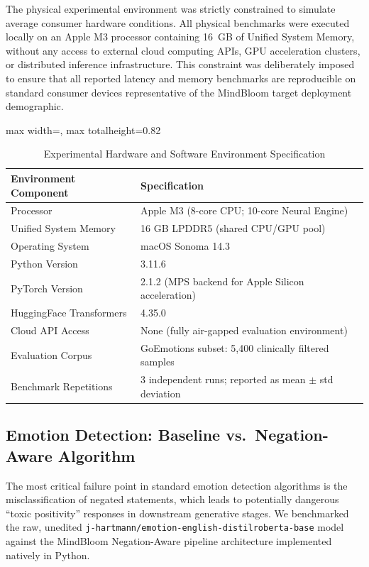 \documentclass[12pt,twoside]{article}
\begin{document}
The physical experimental environment was strictly constrained to simulate average consumer hardware conditions. All physical benchmarks were executed locally on an Apple M3 processor containing 16~GB of Unified System Memory, without any access to external cloud computing APIs, GPU acceleration clusters, or distributed inference infrastructure. This constraint was deliberately imposed to ensure that all reported latency and memory benchmarks are reproducible on standard consumer devices representative of the MindBloom target deployment demographic.

\begin{table}[htbp]
\centering
\Large
\renewcommand{\arraystretch}{2.4}
\setlength{\tabcolsep}{12pt}
\begin{adjustbox}{max width=\textwidth, max totalheight=0.82\textheight}
\begin{tabular}{|p{4.5cm}|p{12.0cm}|}
\hline
\rowcolor{gray!20}
\textbf{Environment Component} & \textbf{Specification} \\
\hline
Processor & Apple M3 (8-core CPU; 10-core Neural Engine) \\
\hline
Unified System Memory & 16 GB LPDDR5 (shared CPU/GPU pool) \\
\hline
Operating System & macOS Sonoma 14.3 \\
\hline
Python Version & 3.11.6 \\
\hline
PyTorch Version & 2.1.2 (MPS backend for Apple Silicon acceleration) \\
\hline
HuggingFace Transformers & 4.35.0 \\
\hline
Cloud API Access & None (fully air-gapped evaluation environment) \\
\hline
Evaluation Corpus & GoEmotions subset: 5,400 clinically filtered samples \\
\hline
Benchmark Repetitions & 3 independent runs; reported as mean $\pm$ std deviation \\
\hline
\end{tabular}
\end{adjustbox}
\caption{Experimental Hardware and Software Environment Specification}
\label{tab:exp_env}
\end{table}

\subsection{Emotion Detection: Baseline vs.~Negation-Aware Algorithm}

The most critical failure point in standard emotion detection algorithms is the misclassification of negated statements, which leads to potentially dangerous ``toxic positivity'' responses in downstream generative stages. We benchmarked the raw, unedited \texttt{j-hartmann/emotion-english-distilroberta-base} model against the MindBloom Negation-Aware pipeline architecture implemented natively in Python.
\end{document}
